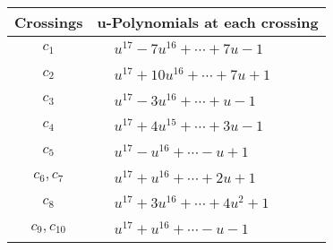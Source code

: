 \documentclass[1p]{elsarticle_modified}
\theoremstyle{definition}
\begin{document}
\begin{tabular}{m{50pt}|m{274pt}}
Crossings & \hspace{64pt}u-Polynomials at each crossing \\
\hline $$\begin{aligned}c_{1}\end{aligned}$$&$\begin{aligned}
&u^{17}-7 u^{16}+\cdots+7 u-1
\end{aligned}$\\
\hline $$\begin{aligned}c_{2}\end{aligned}$$&$\begin{aligned}
&u^{17}+10 u^{16}+\cdots+7 u+1
\end{aligned}$\\
\hline $$\begin{aligned}c_{3}\end{aligned}$$&$\begin{aligned}
&u^{17}-3 u^{16}+\cdots+u-1
\end{aligned}$\\
\hline $$\begin{aligned}c_{4}\end{aligned}$$&$\begin{aligned}
&u^{17}+4 u^{15}+\cdots+3 u-1
\end{aligned}$\\
\hline $$\begin{aligned}c_{5}\end{aligned}$$&$\begin{aligned}
&u^{17}- u^{16}+\cdots- u+1
\end{aligned}$\\
\hline $$\begin{aligned}c_{6},c_{7}\end{aligned}$$&$\begin{aligned}
&u^{17}+u^{16}+\cdots+2 u+1
\end{aligned}$\\
\hline $$\begin{aligned}c_{8}\end{aligned}$$&$\begin{aligned}
&u^{17}+3 u^{16}+\cdots+4 u^2+1
\end{aligned}$\\
\hline $$\begin{aligned}c_{9},c_{10}\end{aligned}$$&$\begin{aligned}
&u^{17}+u^{16}+\cdots- u-1
\end{aligned}$\\

\end{tabular}
\end{document}
